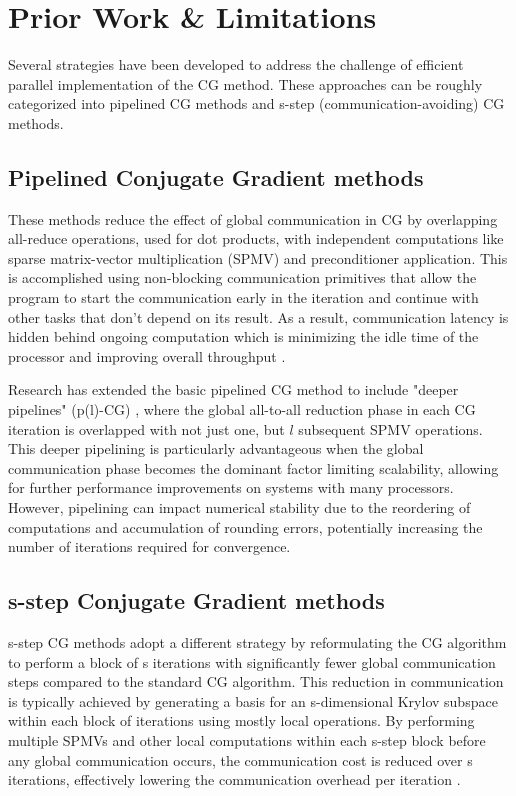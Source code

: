 \documentclass[conference]{IEEEtran}
\begin{document}
\section{Prior Work \& Limitations}
Several strategies have been developed to address the challenge of efficient parallel implementation of the CG method. These approaches can be roughly categorized into pipelined CG methods and s-step (communication-avoiding) CG methods.

\subsection{Pipelined Conjugate Gradient methods}
These methods reduce the effect of global communication in CG by overlapping all-reduce operations, used for dot products, with independent computations like sparse matrix-vector multiplication (SPMV) and preconditioner application. This is accomplished using non-blocking communication primitives that allow the program to start the communication early in the iteration and continue with other tasks that don't depend on its result. As a result, communication latency is hidden behind ongoing computation which is minimizing the idle time of the processor and improving overall throughput \cite{b2}.

Research has extended the basic pipelined CG method to include "deeper pipelines" (p(l)-CG) \cite{b3}, where the global all-to-all reduction phase in each CG iteration is overlapped with not just one, but $l$ subsequent SPMV operations. This deeper pipelining is particularly advantageous when the global communication phase becomes the dominant factor limiting scalability, allowing for further performance improvements on systems with many processors. However, pipelining can impact numerical stability due to the reordering of computations and accumulation of rounding errors, potentially increasing the number of iterations required for convergence.

\subsection{s-step Conjugate Gradient methods}
s-step CG methods adopt a different strategy by reformulating the CG algorithm to perform a block of s iterations with significantly fewer global communication steps compared to the standard CG algorithm. This reduction in communication is typically achieved by generating a basis for an s-dimensional Krylov subspace within each block of iterations using mostly local operations. By performing multiple SPMVs and other local computations within each s-step block before any global communication occurs, the communication cost is reduced over s iterations, effectively lowering the communication overhead per iteration \cite{b4}. 
\end{document}
